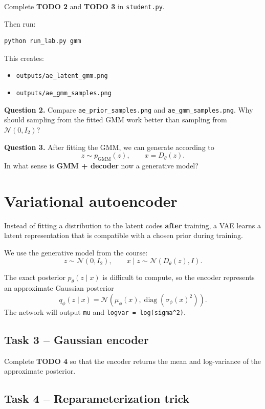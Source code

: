 \documentclass[11pt,a4paper]{article}
\newcommand{\question}[2]{%
  \vspace{0.4em}
  \noindent\textbf{Question #1.} #2
  \vspace{0.5em}
}
\begin{document}
Complete \textbf{TODO 2} and \textbf{TODO 3} in \texttt{student.py}.

Then run:

\begin{lstlisting}[language=bash]
python run_lab.py gmm
\end{lstlisting}

This creates:
\begin{itemize}
  \item \texttt{outputs/ae\_latent\_gmm.png}
  \item \texttt{outputs/ae\_gmm\_samples.png}
\end{itemize}

\question{2}{Compare \texttt{ae\_prior\_samples.png} and \texttt{ae\_gmm\_samples.png}. Why should sampling from the fitted GMM work better than sampling from $\mathcal N(0,I_2)$?}

\question{3}{After fitting the GMM, we can generate according to
\[
z\sim p_{\mathrm{GMM}}(z), \qquad x=D_\theta(z).
\]
In what sense is \textbf{GMM + decoder} now a generative model?}

\section{Variational autoencoder}

Instead of fitting a distribution to the latent codes \textbf{after} training, a VAE learns a latent representation that is compatible with a chosen prior during training.

We use the generative model from the course:
\[
z\sim\mathcal N(0,I_2),
\qquad
x\mid z\sim\mathcal N(D_\theta(z),I).
\]

The exact posterior $p_\theta(z\mid x)$ is difficult to compute, so the encoder represents an approximate Gaussian posterior
\[
q_\phi(z\mid x)
=\mathcal N\!\left(\mu_\phi(x),\operatorname{diag}(\sigma_\phi(x)^2)\right).
\]
The network will output \texttt{mu} and \texttt{logvar = log(sigma\^{}2)}.

\subsection*{Task 3 -- Gaussian encoder}

Complete \textbf{TODO 4} so that the encoder returns the mean and log-variance of the approximate posterior.

\subsection*{Task 4 -- Reparameterization trick}
\end{document}
